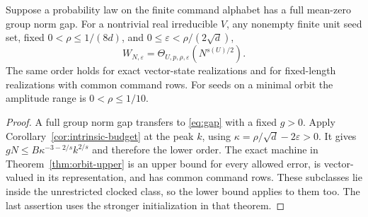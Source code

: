 \begin{corollary}\label{cor:irreducible-width}
Suppose a probability law on the finite command alphabet has a full
mean-zero group norm gap. For a nontrivial real irreducible $V$,
any nonempty finite unit seed set, fixed $0<\rho\le1/(8d)$, and
$0\le\varepsilon<\rho/(2\sqrt d)$,
\begin{equation}\label{eq:irrep-law}
 W_{N,\varepsilon}=\Theta_{U,p,\rho,\varepsilon}(N^{s(U)/2}).
\end{equation}
The same order holds for exact vector-state realizations and for
fixed-length realizations with common command rows. For seeds on a
minimal orbit the amplitude range is $0<\rho\le1/10$.
\end{corollary}
\begin{proof}
A full group norm gap transfers to \eqref{eq:gap} with a fixed $g>0$.
Apply Corollary~\ref{cor:intrinsic-budget} at the peak $k$, using
$\kappa=\rho/\sqrt d-2\varepsilon>0$. It gives
$gN\le B\kappa^{-3-2/s} k^{2/s}$ and therefore the lower order.
The exact machine in Theorem~\ref{thm:orbit-upper} is an upper bound
for every allowed error, is vector-valued in its representation,
and has common command rows. These subclasses lie inside the
unrestricted clocked class, so the lower bound applies to them too.
The last assertion uses the stronger initialization in that theorem.
\end{proof}
